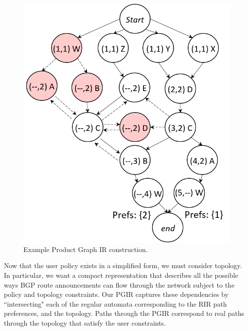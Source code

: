 \begin{figure}
\begin{minipage}[t]{.5\linewidth}
  \end{minipage}
  ~~
  ~~
  \begin{minipage}[t]{.5\linewidth}
  \vspace*{-1\baselineskip}
  \includegraphics[width=.65\columnwidth]{figures/productgraph}
  \end{minipage}

  \hrulefill

  \caption{Example Product Graph IR construction.}
  \label{fig:example-compilation}
\end{figure}

Now that the user policy exists in a simplified form, we must consider topology. In particular, we want a compact representation that describes all the possible ways BGP route announcements can flow through the network subject to the policy and topology constraints. Our PGIR captures these dependencies by ``intersecting" each of the regular automata corresponding to the RIR path preferences, and the topology. Paths through the PGIR correspond to real paths through the topology that satisfy the user constraints.



